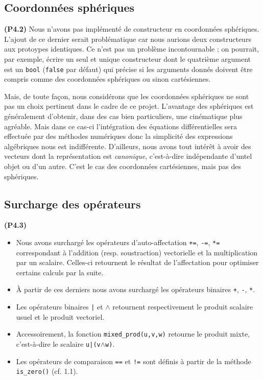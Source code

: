\documentclass[12pt, letterpaper, twoside]{article}
\newcommand{\T}[1]{\texttt{#1}}
\begin{document}
\subsection{Coordonnées sphériques}
\noindent \textbf{(P4.2)} Nous n’avons pas implémenté de constructeur en coordonnées sphériques. L’ajout de ce dernier serait problématique car nous aurions deux constructeurs aux protoypes identiques.  Ce n'est pas un problème incontournable ; on pourrait, par exemple, écrire un seul et unique constructeur dont le quatrième argument est un \T{bool} (\T{false} par défaut) qui précise si les arguments donnés doivent être compris comme des coordonnées sphériques ou sinon cartésiennes.

Mais, de toute façon, nous considérons que les coordonnées sphériques ne sont pas un choix pertinent dans le cadre de ce projet. L'avantage des sphériques est généralement d'obtenir, dans des cas bien particuliers, une cinématique plus agréable. Mais dans ce cas-ci l'intégration des équations différentielles sera effectuée par des méthodes numériques donc la simplicité des expressions algébriques nous est indifférente. D'ailleurs, nous avons tout intérêt à avoir des vecteurs dont la représentation est \textit{canonique}, c'est-à-dire indépendante d'untel objet ou d'un autre. C'est le cas des coordonnées cartésiennes, mais pas des sphériques.

\subsection{Surcharge des opérateurs}
\noindent \textbf{(P4.3)}
\begin{itemize}
\item Nous avons surchargé les opérateurs d'auto-affectation \T{+=}, \T{-=}, \T{*=} correspondant à l'addition (resp. soustraction) vectorielle et la multiplication par un scalaire. Celles-ci retournent le résultat de l'affectation pour optimiser certains calculs par la suite.

\item À partir de ces derniers nous avons surchargé les opérateurs binaires \T{+}, \T{-}, \T{*}.

\item Les opérateurs binaires \T{|} et \T{$\wedge$} retournent respectivement le produit scalaire usuel et le produit vectoriel.

\item Accessoirement, la fonction \T{mixed\_prod(u,v,w)} retourne le produit mixte, c'est-à-dire le scalaire \T{u|(v$\wedge$w)}.

\item Les opérateurs de comparaison \T{==} et \T{!=} sont définis à partir de la méthode \T{is\_zero()} (cf. 1.1).
\end{itemize}
\end{document}
